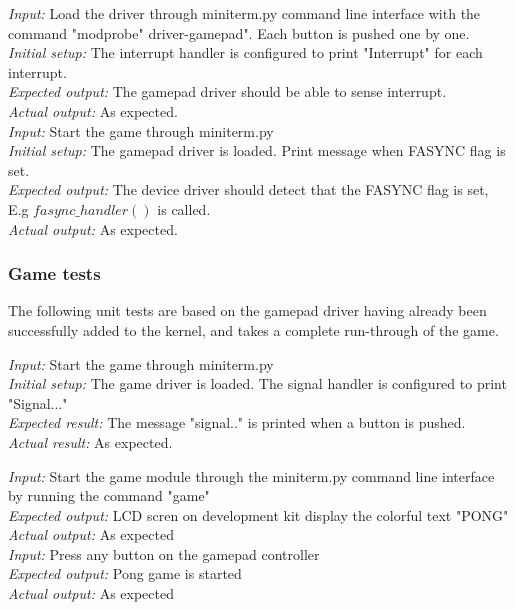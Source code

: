\emph{Input: } Load the driver through miniterm.py command line interface with the command "modprobe" driver-gamepad". Each button is pushed one by one.\\
\emph{Initial setup: } The interrupt handler is configured to print "Interrupt" for each interrupt.\\
\emph{Expected output: } The gamepad driver should be able to sense interrupt.\\
\emph{Actual output: } As expected. \\ 

\emph{Input: } Start the game through miniterm.py  \\
\emph{Initial setup: } The gamepad driver is loaded. Print message when FASYNC flag is set.\\
\emph{Expected output: } The device driver should detect that the FASYNC flag is set, E.g $fasync\_handler()$ is called.\\ 
\emph{Actual output: } As expected. \\




\subsubsection{Game tests}

The following unit tests are based on the gamepad driver having already been successfully added to the kernel, and takes a complete run-through of the game.

\emph{Input: } Start the game through miniterm.py\\
\emph{Initial setup: } The game driver is loaded. The signal handler is configured to print "Signal..."\\
\emph{Expected result: } The message "signal.." is printed when a button is pushed. \\
\emph{Actual result: } As expected. 

\emph{Input: } Start the game module through the miniterm.py command line interface by running the command "game"\\
\emph{Expected output: } LCD scren on development kit display the colorful text "PONG"\\
\emph{Actual output: } As expected \\

\emph{Input: } Press any button on the gamepad controller\\
\emph{Expected output: } Pong game is started\\
\emph{Actual output: } As expected \\

